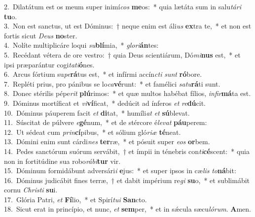 {2.~}Dilatátum est os meum super inimí\textit{cos} \textbf{me}os:~* quia lætáta sum in salu\textit{tá}\textit{ri} \textbf{tu}o.\\
{3.~}Non est sanctus, ut est Dóminus:~† neque enim est áli\textit{us} \textbf{ex}tra te,~* et non est fortis sicut \textit{De}\textit{us} \textbf{no}ster.\\
{4.~}Nolíte multiplicáre loqui \textit{su}\textbf{blí}mia,~* \textit{glo}\textit{ri}\textbf{án}tes:\\
{5.~}Recédant vétera de ore vestro:~† quia Deus scientiárum, Dó\textit{mi}\textbf{nus} est,~* et ipsi præparántur cogi\textit{ta}\textit{ti}\textbf{ó}nes.\\
{6.~}Arcus fórtium su\textit{pe}\textbf{rá}tus est,~* et infírmi accín\textit{cti} \textit{sunt} \textbf{ró}bore.\\
{7.~}Repléti prius, pro pánibus se lo\textit{ca}\textbf{vé}runt:~* et famélici \textit{sa}\textit{tu}\textbf{rá}ti sunt.\\
{8.~}Donec stérilis pépe\textit{rit} \textbf{plú}rimos:~* et quæ multos habébat fílios, \textit{in}\textit{fir}\textbf{má}ta est.\\
{9.~}Dóminus mortíficat et \textit{vi}\textbf{ví}ficat,~* dedúcit ad ínferos \textit{et} \textit{re}\textbf{dú}cit.\\
{10.~}Dóminus páuperem facit \textit{et} \textbf{di}tat,~* humíli\textit{at} \textit{et} \textbf{sú}blevat.\\
{11.~}Súscitat de púlvere \textit{e}\textbf{gé}num,~* et de stércore é\textit{le}\textit{vat} \textbf{páu}perem:\\
{12.~}Ut sédeat cum \textit{prin}\textbf{cí}pibus,~* et sólium gló\textit{ri}\textit{æ} \textbf{té}neat.\\
{13.~}Dómini enim sunt cárdi\textit{nes} \textbf{ter}ræ,~* et pósuit super \textit{e}\textit{os} \textbf{or}bem.\\
{14.~}Pedes sanctórum suórum servábit,~† et ímpii in ténebris con\textit{ti}\textbf{cé}scent:~* quia non in fortitúdine sua robo\textit{rá}\textit{bi}\textbf{tur} vir.\\
{15.~}Dóminum formidábunt adversári\textit{i} \textbf{e}jus:~* et super ipsos in cæ\textit{lis} \textit{to}\textbf{ná}bit:\\
{16.~}Dóminus judicábit fines terræ,~† et dabit impérium re\textit{gi} \textbf{su}o,~* et sublimábit cornu \textit{Chri}\textit{sti} \textbf{su}i.\\
{17.~}Glória Patri, \textit{et} \textbf{Fí}lio,~* et Spirí\textit{tu}\textit{i} \textbf{San}cto.\\
{18.~}Sicut erat in princípio, et nunc, \textit{et} \textbf{sem}per,~* et in sǽcula sæcu\textit{ló}\textit{rum}. \textbf{A}men.\\
